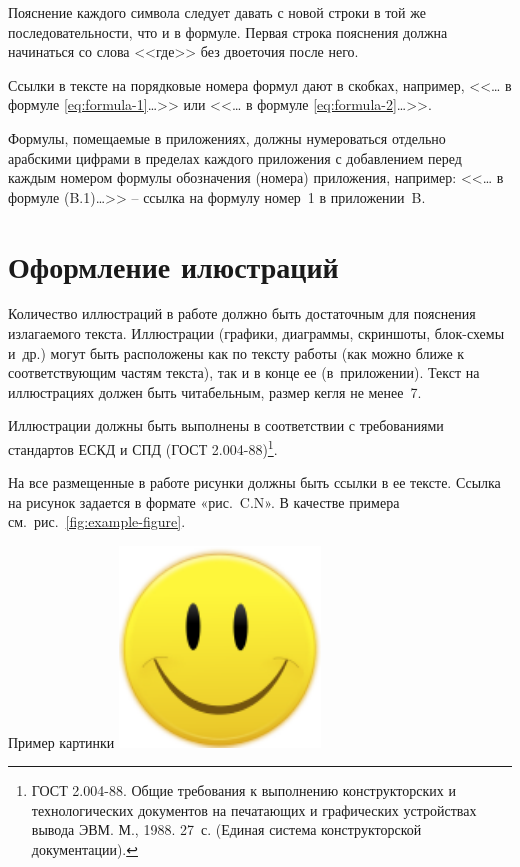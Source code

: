\documentclass[PI,VKR]{HSEUniversityPractice}
\begin{document}
Пояснение каждого символа следует давать с новой строки в той же последовательности, что и в формуле. Первая строка пояснения должна начинаться со слова <<где>> без двоеточия после него.

Ссылки в тексте на порядковые номера формул дают в скобках, например, <<\dots{} в формуле \eqref{eq:formula-1}\dots>> или <<\dots{} в формуле \eqref{eq:formula-2}\dots>>.

Формулы, помещаемые в приложениях, должны нумероваться отдельно арабскими цифрами в пределах каждого приложения с добавлением перед каждым номером формулы обозначения (номера) приложения, например: <<\dots{} в формуле (B.1)\dots>> – ссылка на формулу номер 1 в приложении B.

\section{Оформление илюстраций}

Количество иллюстраций в работе должно быть достаточным для пояснения излагаемого текста. Иллюстрации (графики, диаграммы, скриншоты, блок-схемы и др.) могут быть расположены как по тексту работы (как можно ближе к соответствующим частям текста), так и в конце ее (в приложении). Текст на иллюстрациях должен быть читабельным, размер кегля не менее 7.

Иллюстрации должны быть выполнены в соответствии с требованиями стандартов ЕСКД и СПД (ГОСТ 2.004-88)\footnote{ГОСТ 2.004-88. Общие требования к выполнению конструкторских и технологических документов на печатающих и графических устройствах вывода ЭВМ. М., 1988. 27 с. (Единая система конструкторской документации).}.

На все размещенные в работе рисунки должны быть ссылки в ее тексте. Ссылка на рисунок задается в формате «рис. C.N». В качестве примера см.~рис.~\ref{fig:example-figure}.

\begin{FIGURE}[t]{Пример картинки\label{fig:example-figure}}
	\includegraphics[width=0.4\textwidth]{img/fig}
\end{FIGURE}
\end{document}
